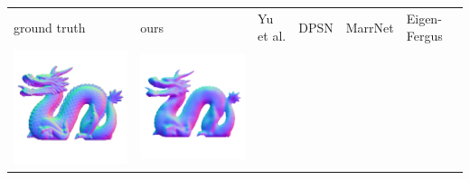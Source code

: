 \begin{center}
\begin{tabularx}{\linewidth}{@{}Y@{}Y@{}Y@{}Y@{}Y@{}Y@{}}
ground truth & ours & Yu et al. & DPSN & MarrNet & Eigen-Fergus \\
\includegraphics[width=\linewidth]{semisynthetic/20150514_21_gt.png} &
\includegraphics[width=\linewidth]{semisynthetic/20150514_21_ours_out.png} &

\end{tabularx}
\end{center}
